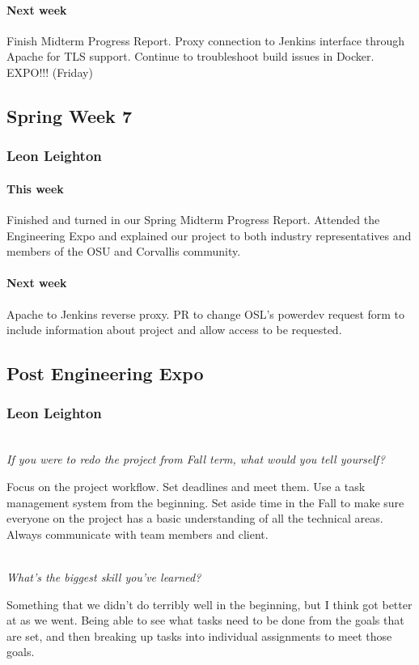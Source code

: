 \documentclass[10pt,letterpaper,onecolumn,draftclsnofoot]{IEEEtran}
\begin{document}
\paragraph{Next week}Finish Midterm Progress Report.  
Proxy connection to Jenkins interface through Apache for TLS support.  
Continue to troubleshoot build issues in Docker.  
EXPO!!! (Friday)

\subsection{Spring Week 7}
\subsubsection{Leon Leighton}
\paragraph{This week}Finished and turned in our Spring Midterm Progress Report.  
Attended the Engineering Expo and explained our project to both industry representatives and members of the OSU and Corvallis community.  
\paragraph{Next week}Apache to Jenkins reverse proxy.  
PR to change OSL's powerdev request form to include information about project and allow access to be requested.

\subsection{Post Engineering Expo}
\subsubsection{Leon Leighton}
\textit{\\If you were to redo the project from Fall term, what would you tell yourself?}

Focus on the project workflow. Set deadlines and meet them. Use a task management system from the beginning. Set aside time in the Fall to make sure everyone on the project has a basic understanding of all the technical areas. Always communicate with team members and client.

\textit{\\What's the biggest skill you've learned?}

Something that we didn't do terribly well in the beginning, but I think got better at as we went. Being able to see what tasks need to be done from the goals that are set, and then breaking up tasks into individual assignments to meet those goals.
\end{document}
